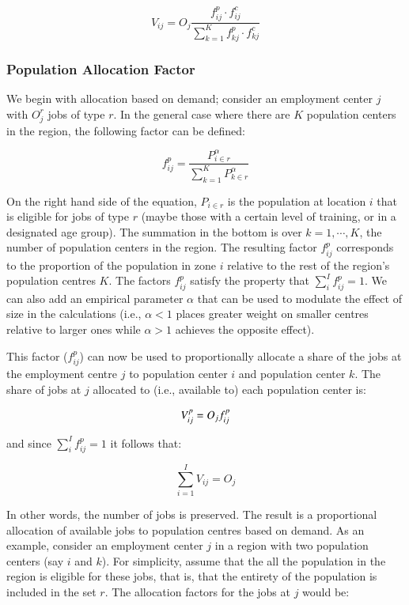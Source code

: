 \documentclass[]{elsarticle} %
\begin{document}
\[
V_{ij} = O_j\frac{f^p_{ij} \cdot f^c_{ij}}{\sum_{k=1}^K f^p_{kj} \cdot f^c_{kj}}
\]

\hypertarget{population-allocation-factor}{%
\subsubsection{Population Allocation
Factor}\label{population-allocation-factor}}

We begin with allocation based on demand; consider an employment center
\(j\) with \(O_j^r\) jobs of type \(r\). In the general case where there
are \(K\) population centers in the region, the following factor can be
defined:

\[
f^p_{ij} = \frac{P_{i\in r}^\alpha}{\sum_{k=1}^K P_{k\in r}^\alpha}
\]

\noindent On the right hand side of the equation, \(P_{i\in r}\) is the
population at location \(i\) that is eligible for jobs of type \(r\)
(maybe those with a certain level of training, or in a designated age
group). The summation in the bottom is over \(k=1,\cdots,K\), the number
of population centers in the region. The resulting factor \(f^p_{ij}\)
corresponds to the proportion of the population in zone \(i\) relative
to the rest of the region's population centres \(K\). The factors
\(f^p_{ij}\) satisfy the property that \(\sum_i^{I} f^p_{ij} = 1\). We
can also add an empirical parameter \(\alpha\) that can be used to
modulate the effect of size in the calculations (i.e., \(\alpha <1\)
places greater weight on smaller centres relative to larger ones while
\(\alpha>1\) achieves the opposite effect).

This factor (\(f^p_{ij}\)) can now be used to proportionally allocate a
share of the jobs at the employment centre \(j\) to population center
\(i\) and population center \(k\). The share of jobs at \(j\) allocated
to (i.e., available to) each population center is:

\[
V^p_{ij} = O_jf^p_{ij}\\
\]

\noindent and since \(\sum_i^{I} f^p_{ij} = 1\) it follows that:

\[
\sum_{i=1}^I V_{ij} = O_j 
\]

In other words, the number of jobs is preserved. The result is a
proportional allocation of available jobs to population centres based on
demand. As an example, consider an employment center \(j\) in a region
with two population centers (say \(i\) and \(k\)). For simplicity,
assume that the all the population in the region is eligible for these
jobs, that is, that the entirety of the population is included in the
set \(r\). The allocation factors for the jobs at \(j\) would be:
\end{document}
